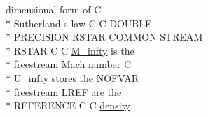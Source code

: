 \begin{DoxyCompactItemize}
dimensional form of C \\*
Sutherland s law C C D\-O\-U\-B\-L\-E \\*
P\-R\-E\-C\-I\-S\-I\-O\-N R\-S\-T\-A\-R C\-O\-M\-M\-O\-N S\-T\-R\-E\-A\-M \\*
R\-S\-T\-A\-R C C \hyperlink{stream_8com_a57c765efd76d44669f6966962bda2d72}{M\-\_\-infty} is the \\*
freestream Mach number C \\*
\hyperlink{stream_8com_a3306f725a42d6173548f0867aa4313ef}{U\-\_\-infty} stores the N\-O\-F\-V\-A\-R \\*
freestream \hyperlink{stream_8com_a19d492a15feda819ed49e580c6a1568f}{L\-R\-E\-F} \hyperlink{ibc8_8com_a7f7721a0bb3c1d35cfbfbcfd6efc1548}{are} the \\*
R\-E\-F\-E\-R\-E\-N\-C\-E C C \hyperlink{stream_8com_ae3461cde09d7d40d4800995573999b7e}{density}
\end{DoxyCompactItemize}


